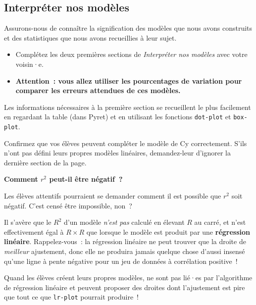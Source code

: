 \documentclass[12pt,a4paper]{article}
\begin{document}
\subsection{Interpréter nos modèles}

\begin{activitybox}
  Assurons-nous de connaître la signification des modèles que nous avons construits et des statistiques que nous avons recueillies à leur sujet.

  \begin{itemize}
    \item Complétez les deux premières sections de \emph{Interpréter nos modèles} avec votre voisin·e.
    \item \textbf{Attention~: vous allez utiliser les pourcentages de variation pour comparer les erreurs attendues de ces modèles.}
  \end{itemize}
\end{activitybox}

\begin{instructornotes}
  Les informations nécessaires à la première section se recueillent le plus facilement en regardant la table (dans Pyret) et en utilisant les fonctions \texttt{dot-plot} et \texttt{box-plot}.

  Confirmez que vos élèves peuvent compléter le modèle de Cy correctement. S'ils n'ont pas défini leurs propres modèles linéaires, demandez-leur d'ignorer la dernière section de la page.
\end{instructornotes}

\begin{thinkbox}
  \textbf{Comment $r^2$ peut-il être négatif~?}

  Les élèves attentifs pourraient se demander comment il est possible que $r^2$ soit négatif. C'est censé être impossible, non~?

  Il s'avère que le $R^2$ d'un modèle \emph{n'est pas} calculé en élevant $R$ au carré, et n'est effectivement égal à $R \times R$ que lorsque le modèle est produit par une \textbf{régression linéaire}. Rappelez-vous~: la régression linéaire ne peut trouver que la droite de \emph{meilleur} ajustement, donc elle ne produira jamais quelque chose d'aussi insensé qu'une ligne à pente négative pour un jeu de données à corrélation positive~!

  Quand les élèves créent leurs propres modèles, ne sont pas lié·es par l'algorithme de régression linéaire et peuvent proposer des droites dont l'ajustement est pire que tout ce que \texttt{lr-plot} pourrait produire~!
\end{thinkbox}
\end{document}
